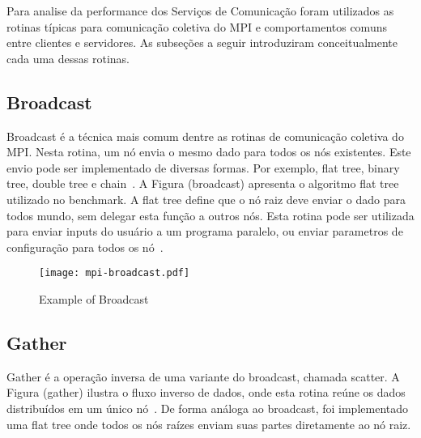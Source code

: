 		Para analise da performance dos Serviços de Comunicação foram utilizados as rotinas típicas para comunicação coletiva do MPI e comportamentos comuns entre clientes e servidores.
		As subseções a seguir introduziram conceitualmente cada uma dessas rotinas.

		\subsection{Broadcast}

			Broadcast é a técnica mais comum dentre as rotinas de comunicação coletiva do MPI.
			Nesta rotina, um nó envia o mesmo dado para todos os nós existentes.
			Este envio pode ser implementado de diversas formas.
			Por exemplo, flat tree, binary tree, double tree e chain~\cite{survey-mpi}.
			A Figura (broadcast) apresenta o algoritmo flat tree utilizado no benchmark.
			A flat tree define que o nó raiz deve enviar o dado para todos mundo, sem delegar esta função a outros nós. 
			Esta rotina pode ser utilizada para enviar inputs do usuário a um programa paralelo, ou enviar parametros de configuração para todos os nó~\cite{url:mpitutorial}.

			\begin{figure}[!tb]
				\centering%
				\caption{Example of \mpi Broadcast}%
				\label{fig:exp-broadcast}%
				\texttt{[image: mpi-broadcast.pdf]}%
			\end{figure}




		\subsection{Gather}

			Gather é a operação inversa de uma variante do broadcast, chamada scatter.
			A Figura (gather) ilustra o fluxo inverso de dados, onde esta rotina reúne os  dados distribuídos em um único nó~\cite{url:mpitutorial}.
			De forma análoga ao broadcast, foi implementado uma flat tree onde todos os nós raízes enviam suas partes diretamente ao nó raiz.


